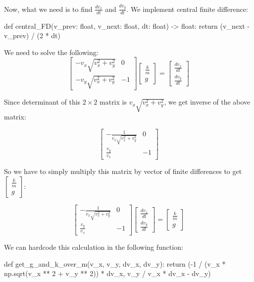 \documentclass{article}
\begin{document}
	Now, what we need is to find $\frac{dv_x}{dt}$ and $\frac{dv_y}{dt}$. We implement central finite difference:
	
\begin{python}
def central_FD(v_prev: float, v_next: float, dt: float) -> float:
		return (v_next - v_prev) / (2 * dt)
\end{python}
	
 	We need to solve the following:
	 $$\begin{bmatrix} -v_x \sqrt{v_x^2 + v_y^2} & 0 \\ -v_y \sqrt{v_x^2 + v_y^2} & -1 \end{bmatrix} \begin{bmatrix} \frac{k}{m} \\ g \end{bmatrix} = \begin{bmatrix} \frac{dv_x}{dt} \\ \frac{dv_y}{dt} \end{bmatrix}$$
	
	Since determinant of this $2 \times 2$ matrix is $v_x \sqrt{v_x^2 + v_y^2}$, we get inverse of the above matrix:
	
	$$\begin{bmatrix} -\frac{1}{v_x \sqrt{v_x^2 + v_y^2}} & 0 \\ \frac{v_y}{v_x} & -1 \end{bmatrix}$$
	
	So we have to simply multiply this matrix by vector of finite differences to get $\begin{bmatrix} \frac{k}{m} \\ g \end{bmatrix}$:
	
	$$\begin{bmatrix} -\frac{1}{v_x \sqrt{v_x^2 + v_y^2}} & 0 \\ \frac{v_y}{v_x} & -1 \end{bmatrix} \begin{bmatrix} \frac{dv_x}{dt} \\ \frac{dv_y}{dt} \end{bmatrix} = \begin{bmatrix} \frac{k}{m} \\ g \end{bmatrix}$$
	
	We can hardcode this calculation in the following function:
	
\begin{python}
def get_g_and_k_over_m(v_x, v_y, dv_x, dv_y):
		return (-1 / (v_x * np.sqrt(v_x ** 2 + v_y ** 2)) * dv_x, 
			v_y / v_x * dv_x - dv_y)
\end{python}
\end{document}
